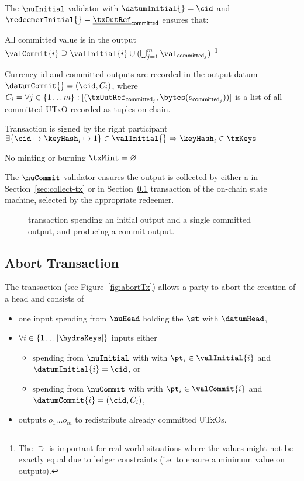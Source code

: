 \noindent The $\nuInitial$ validator with $\datumInitial{} = \cid$ and
$\redeemerInitial{} = \underline{\txOutRef}_{\mathsf{committed}}$ ensures that:
\begin{menumerate}
  \item All committed value is in the output
  $\valCommit{i} \supseteq \valInitial{i} \cup (\bigcup_{j=1}^{m} \val_{\mathsf{committed}_{j}})$
  \footnote{The $\supseteq$ is important for real world situations where the values
	might not be exactly equal due to ledger constraints (i.e. to ensure a
	minimum value on outputs).}
  \item Currency id and committed outputs are recorded in the output datum
  $\datumCommit{} = (\cid, C_{i})$, where
  $C_{i} = \forall j \in \{1 \dots m\} : [(\txOutRef_{\mathsf{committed}_{j}},\bytes(o_{\mathsf{committed}_{j}}))]$
  is a list of all committed UTxO recorded as tuples on-chain.
  \item Transaction is signed by the right participant
  $\exists \{\cid \mapsto \keyHash_{i} \mapsto 1\} \in \valInitial{} \Rightarrow \keyHash_{i} \in \txKeys$
  \item No minting or burning $\txMint = \varnothing$
\end{menumerate}

\noindent The $\nuCommit$ validator ensures the output is collected by either a
\mtxCCom{} in Section~\ref{sec:collect-tx} or \mtxAbort{} in
Section~\ref{sec:abort-tx} transaction of the on-chain state machine, selected
by the appropriate redeemer.

\begin{figure}
  \centering
  
  \caption{\mtxCom{} transaction spending an initial output and a single
	committed output, and producing a commit output.}\label{fig:commitTx}
\end{figure}

\subsection{Abort Transaction}\label{sec:abort-tx}

The \mtxAbort{} transaction (see Figure~\ref{fig:abortTx}) allows a
party to abort the creation of a head and consists of
\begin{itemize}
  \item one input spending from $\nuHead$ holding the $\st$ with $\datumHead$,
  \item $\forall i \in \{1 \dots |\hydraKeys|\}$ inputs either
  \begin{itemize}
	\item spending from $\nuInitial$ with with $\pt_{i} \in \valInitial{i}$ and $\datumInitial{i} = \cid$, or
	\item spending from $\nuCommit$ with with $\pt_{i} \in \valCommit{i}$ and $\datumCommit{i} = (\cid, C_{i})$,
  \end{itemize}
  \item outputs $o_{1} \dots o_{m}$ to redistribute already committed UTxOs.
\end{itemize}

